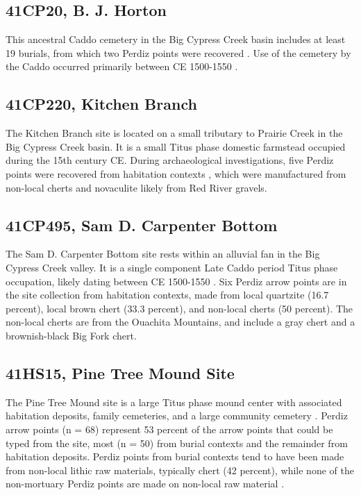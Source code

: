 \documentclass[review]{elsarticle}
\begin{document}
\subsection*{41CP20, B. J. Horton}

This ancestral Caddo cemetery in the Big Cypress Creek basin includes at least 19 burials, from which two Perdiz points were recovered \citep[9]{RN2439}. Use of the cemetery by the Caddo occurred primarily between CE 1500-1550 \citep[494]{RN8964}.

\subsection*{41CP220, Kitchen Branch}

The Kitchen Branch site is located on a small tributary to Prairie Creek in the Big Cypress Creek basin. It is a small Titus phase domestic farmstead occupied during the 15th century CE. During archaeological investigations, five Perdiz points were recovered from habitation contexts \citep{RN8964}, which were manufactured from non-local cherts and novaculite \citep[410]{RN8964} likely from Red River gravels.

\subsection*{41CP495, Sam D. Carpenter Bottom}

The Sam D. Carpenter Bottom site rests within an alluvial fan in the Big Cypress Creek valley. It is a single component Late Caddo period Titus phase occupation, likely dating between CE 1500-1550 \citep{RN2275}. Six Perdiz arrow points are in the site collection from habitation contexts, made from local quartzite (16.7 percent), local brown chert (33.3 percent), and non-local cherts (50 percent). The non-local cherts are from the Ouachita Mountains, and include a gray chert and a brownish-black Big Fork chert.

\subsection*{41HS15, Pine Tree Mound Site}

The Pine Tree Mound site is a large Titus phase mound center with associated habitation deposits, family cemeteries, and a large community cemetery \citep{RN5724}. Perdiz arrow points (n = 68) represent 53 percent of the arrow points that could be typed from the site, most (n = 50) from burial contexts and the remainder from habitation deposits. Perdiz points from burial contexts tend to have been made from non-local lithic raw materials, typically chert (42 percent), while none of the non-mortuary Perdiz points are made on non-local raw material \citep[566]{RN5724}.
\end{document}
